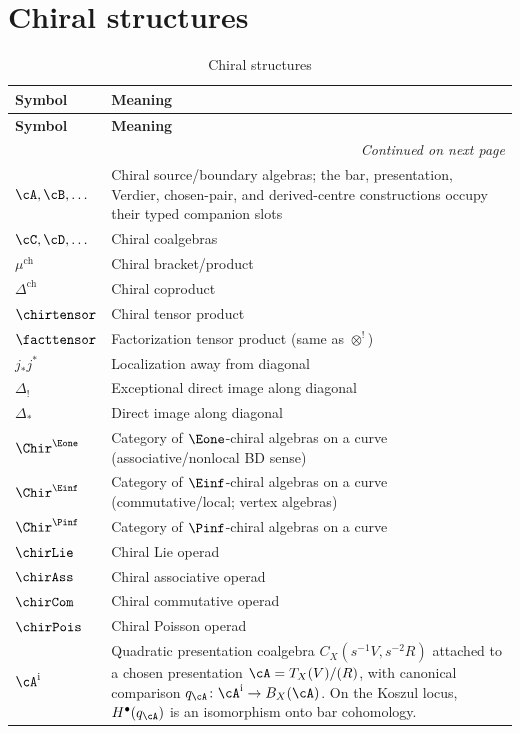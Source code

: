 \section{Chiral structures}
\label{sec:notation-chiral}

\begin{longtable}{p{3cm} p{10cm}}
\caption{Chiral structures} \\
\toprule
\textbf{Symbol} & \textbf{Meaning} \\
\midrule
\endfirsthead
\toprule
\textbf{Symbol} & \textbf{Meaning} \\
\midrule
\endhead
\midrule
\multicolumn{2}{r}{\textit{Continued on next page}} \\
\endfoot
\bottomrule
\endlastfoot

$\cA, \cB, \ldots$ & Chiral source/boundary algebras; the bar, presentation, Verdier, chosen-pair, and derived-centre constructions occupy their typed companion slots \\
$\cC, \cD, \ldots$ & Chiral coalgebras \\
$\mu^{\mathrm{ch}}$ & Chiral bracket/product \\
$\Delta^{\mathrm{ch}}$ & Chiral coproduct \\
$\chirtensor$ & Chiral tensor product \\
$\facttensor$ & Factorization tensor product (same as $\otimes^!$) \\
$j_* j^*$ & Localization away from diagonal \\
$\Delta_!$ & Exceptional direct image along diagonal \\
$\Delta_*$ & Direct image along diagonal \\
$\Chir^{\Eone}$ & Category of $\Eone$-chiral algebras on a curve (associative/nonlocal BD sense) \\
$\Chir^{\Einf}$ & Category of $\Einf$-chiral algebras on a curve (commutative/local; vertex algebras) \\
$\Chir^{\Pinf}$ & Category of $\Pinf$-chiral algebras on a curve \\
%
$\chirLie$ & Chiral Lie operad \\
$\chirAss$ & Chiral associative operad \\
$\chirCom$ & Chiral commutative operad \\
$\chirPois$ & Chiral Poisson operad \\
$\cA^{\mathrm i}$ & Quadratic presentation coalgebra $C_X(s^{-1}V,s^{-2}R)$ attached to a chosen presentation $\cA=T_X(V)/(R)$, with canonical comparison $q_\cA\colon\cA^{\mathrm i}\to B_X(\cA)$.  On the Koszul locus, $H^\bullet(q_\cA)$ is an isomorphism onto bar cohomology. \\

\end{longtable}
